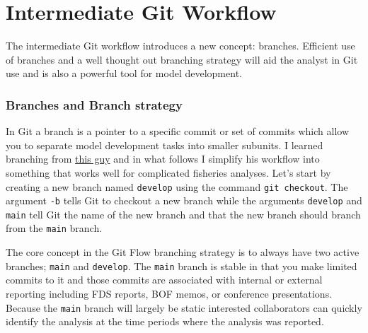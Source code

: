 \documentclass[
  letterpaper,
  DIV=11,
  numbers=noendperiod]{scrreprt}
\newenvironment{Shaded}{\begin{snugshade}}{\end{snugshade}}
\newcommand{\NormalTok}[1]{\textcolor[rgb]{0.00,0.23,0.31}{#1}}
\begin{document}

\hypertarget{intermediate-git-workflow}{%
\chapter{Intermediate Git Workflow}\label{intermediate-git-workflow}}

The intermediate Git workflow introduces a new concept: branches.
Efficient use of branches and a well thought out branching strategy will
aid the analyst in Git use and is also a powerful tool for model
development.

\hypertarget{branches-and-branch-strategy}{%
\subsection{Branches and Branch
strategy}\label{branches-and-branch-strategy}}

In Git a branch is a pointer to a specific commit or set of commits
which allow you to separate model development tasks into smaller
subunits. I learned branching from
\href{https://nvie.com/posts/a-successful-git-branching-model/}{this
guy} and in what follows I simplify his workflow into something that
works well for complicated fisheries analyses. Let's start by creating a
new branch named \texttt{develop} using the command
\texttt{git\ checkout}. The argument \texttt{-b} tells Git to checkout a
new branch while the arguments \texttt{develop} and \texttt{main} tell
Git the name of the new branch and that the new branch should branch
from the \texttt{main} branch.

\begin{Shaded}
\end{Shaded}

The core concept in the Git Flow branching strategy is to always have
two active branches; \texttt{main} and \texttt{develop}. The
\texttt{main} branch is stable in that you make limited commits to it
and those commits are associated with internal or external reporting
including FDS reports, BOF memos, or conference presentations. Because
the \texttt{main} branch will largely be static interested collaborators
can quickly identify the analysis at the time periods where the analysis
was reported.
\end{document}
